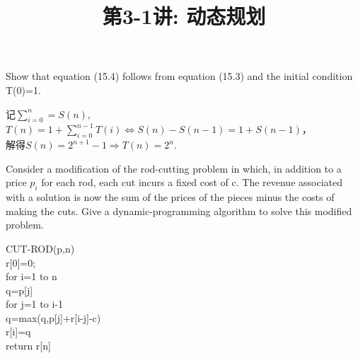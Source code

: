 \documentclass[a4paper, justified]{tufte-handout}
\title{第3-1讲: 动态规划}
\date{\zhtoday} %
\begin{document}
\maketitle
\noplagiarism %
\begin{abstract}
\end{abstract}
\beginrequired

\begin{problem}[TC 15.1-1]
Show that equation (15.4) follows from equation (15.3) and the initial condition T(0)=1.
\end{problem}

\begin{solution}
记$\sum\limits_{i=0}^{n}=S(n)$,\\
$T(n)=1+\sum\limits_{i=0}^{n-1}T(i)\Leftrightarrow S(n)-S(n-1)=1+S(n-1)$，\\
解得$S(n)=2^{n+1}-1\Rightarrow T(n)=2^n$.
\end{solution}

\begin{problem}[TC 15.1-3]
Consider  a  modification  of  the  rod-cutting  problem  in  which,  in  addition  to  a price $p_i$ for each rod, each cut incurs a fixed cost of c. The revenue associated with a solution is now the sum of the prices of the pieces minus the costs of making the cuts. Give a dynamic-programming algorithm to solve this modified problem.
\end{problem}

\begin{solution}
CUT-ROD(p,n)\\
\hspace*{0.6 cm} r[0]=0;\\
\hspace*{0.6 cm} for i=1 to n\\
\hspace*{1.6 cm} q=p[j]\\
\hspace*{1.6 cm} for j=1 to i-1\\
\hspace*{2.6 cm} q=max(q,p[j]+r[i-j]-c)\\
\hspace*{1.6 cm} r[i]=q\\
\hspace*{0.6 cm} return r[n]\\
\end{solution}
\end{document}
